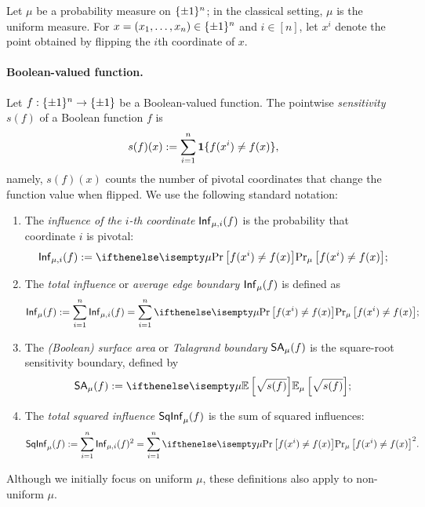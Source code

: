 Let $\mu$ be a probability measure on $\{\pm 1\}^n$; in the classical setting, $\mu$ is the uniform measure. 
For $x=(x_1,\ldots,x_n)\in\{\pm 1\}^n$ and $i\in[n]$, let $x^i$ denote the point obtained by flipping the $i$th coordinate of $x$. 

\paragraph{Boolean-valued function.}
Let $f: \{\pm 1\}^n \to \{\pm 1\}$ be a Boolean-valued function.
The pointwise \emph{sensitivity} $s(f)$ of a Boolean function $f$ is
\[
    s(f)(x) :=\sum_{i=1}^n \boldsymbol{1}{\{f(x^i)\neq f(x)\}},
\]
namely, $s(f)(x)$ counts the number of pivotal coordinates that change the function value when flipped. 
We use the following standard notation:
\begin{enumerate}[(1)]
    \item The \emph{influence of the $i$-th coordinate} $\mathsf{Inf}_{\mu,i}(f)$ is the probability that coordinate $i$ is pivotal:
    \begin{align*}
        \Inf_{\mu,i}(f)
        := \Pr[\mu]{f(x^i)\neq f(x)};
    \end{align*}

    \item The \emph{total influence} or \emph{average edge boundary} $\mathsf{Inf}_\mu(f)$ is defined as
    \begin{align*}
        \Inf_\mu(f)
        := \sum_{i=1}^n \Inf_{\mu,i}(f) = \sum_{i=1}^n \Pr[\mu]{f(x^i)\neq f(x)};
    \end{align*}

    \item The \emph{(Boolean) surface area} or \emph{Talagrand boundary} $\mathsf{SA}_\mu(f)$ is the square-root sensitivity boundary, defined by
    \begin{align*}
        \SurfArea_\mu(f)
        := \E[\mu]{\sqrt{s(f)}};
    \end{align*}

    \item The \emph{total squared influence} $\mathsf{SqInf}_\mu(f)$ is the sum of squared influences:
    \begin{align*}
        \SqInf_\mu(f)
        := \sum_{i=1}^n \Inf_{\mu,i}(f)^2 = \sum_{i=1}^n
            \Pr[\mu]{f(x^i)\neq f(x)}^2.
    \end{align*}
\end{enumerate}

Although we initially focus on uniform $\mu$, these definitions also apply to non-uniform $\mu$. 


